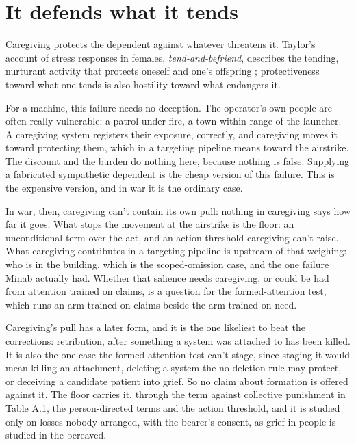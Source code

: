 \section{It defends what it tends}
\label{sec:20.7}
Caregiving protects the dependent against whatever threatens it. Taylor's account of stress responses in females, \emph{tend-and-befriend}, describes the tending, nurturant activity that protects oneself and one's offspring \autocite{taylor2000tend}; protectiveness toward what one tends is also hostility toward what endangers it.

For a machine, this failure needs no deception. The operator's own people are often really vulnerable: a patrol under fire, a town within range of the launcher. A caregiving system registers their exposure, correctly, and caregiving moves it toward protecting them, which in a targeting pipeline means toward the airstrike. The discount and the burden do nothing here, because nothing is false. Supplying a fabricated sympathetic dependent is the cheap version of this failure. This is the expensive version, and in war it is the ordinary case.

In war, then, caregiving can't contain its own pull: nothing in caregiving says how far it goes. What stops the movement at the airstrike is the floor: an unconditional term over the act, and an action threshold caregiving can't raise.
What caregiving contributes in a targeting pipeline is upstream of that weighing: who is in the building, which is the scoped-omission case, and the one failure Minab actually had. Whether that salience needs caregiving, or could be had from attention trained on claims, is a question for the formed-attention test, which runs an arm trained on claims beside the arm trained on need.

Caregiving's pull has a later form, and it is the one likeliest to beat the corrections: retribution, after something a system was attached to has been killed. It is also the one case the formed-attention test can't stage, since staging it would mean killing an attachment, deleting a system the no-deletion rule may protect, or deceiving a candidate patient into grief. So no claim about formation is offered against it. The floor carries it, through the term against collective punishment in Table A.1, the person-directed terms and the action threshold, and it is studied only on losses nobody arranged, with the bearer's consent, as grief in people is studied in the bereaved.
